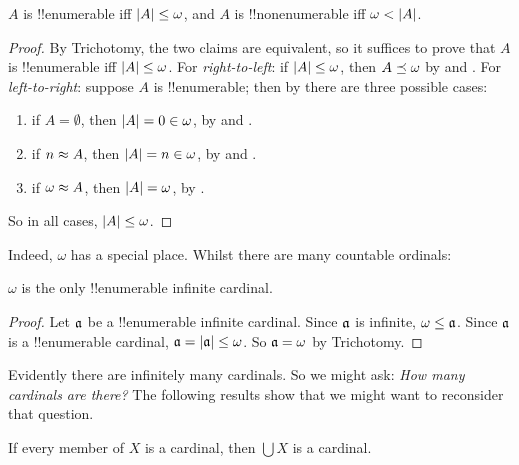 \documentclass[../../../include/open-logic-section]{subfiles}
\begin{document}
\begin{prop}
$A$ is !!{enumerable} iff $\left| A \right| \leq \omega$, and $A$ is
!!{nonenumerable} iff $\omega < \left| A \right|$.
\end{prop}

\begin{proof}
By Trichotomy, the two claims are equivalent, so it suffices to prove
that $A$ is !!{enumerable} iff $\left| A \right| \leq \omega$. For
\emph{right-to-left}: if $\left| A \right| \leq \omega$, then
$A \preceq \omega$ by
 and
. For \emph{left-to-right}: suppose $A$ is
!!{enumerable}; then by  there
are three possible cases:
\begin{enumerate}
	\item if $A = \emptyset$, then $\left| A \right| = 0 \in \omega$, by
	 and
	.
	\item if $n \approx A$, then $\left| A \right| = n \in \omega$, by
	 and
	.
	\item if $\omega \approx A$, then $\left| A \right| = \omega$, by .
\end{enumerate}
So in all cases, $\left| A \right| \leq \omega$. 
\end{proof}

Indeed, $\omega$ has a special place. Whilst there are many countable ordinals:

\begin{cor}
$\omega$ is the only !!{enumerable} infinite cardinal.
\end{cor}

\begin{proof}
Let $\mathfrak{a}$ be a !!{enumerable} infinite cardinal. Since
$\mathfrak{a}$ is infinite, $\omega \leq \mathfrak{a}$. Since
$\mathfrak{a}$ is a !!{enumerable} cardinal, $\mathfrak{a} =
\left| \mathfrak{a} \right| \leq \omega$. So $\mathfrak{a} = \omega$ by
Trichotomy. \end{proof}

Evidently there are infinitely many cardinals. So we might ask:
\emph{How many cardinals are there?} The following results show that
we might want to reconsider that question.

\begin{prop}
If every member of $X$ is a cardinal, then $\bigcup X$ is a cardinal.
\end{prop}
\end{document}
